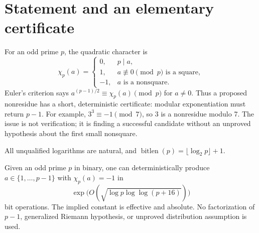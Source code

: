 \begin{abstract}
Given an odd prime $p$, a quadratic nonresidue is a nonzero residue which
is not a square modulo $p$.  We give a deterministic construction using
\[
 \exp\!\bigl(O(\sqrt{\log p\log\log(p+16)})\bigr)
\]
bit operations, with effective absolute constants.  The algorithm does
not require a factorization of $p-1$.  It tests a rigorously specified
finite list of rational integers and modular images of units and small
principal-ideal generators in quadratic and biquadratic fields.
A sparse positive-semidefinite Gram average, including ramified primes,
forces one negative character value; a uniform varying-field Burgess
estimate supplies the contradiction if none exists.  This manuscript
contains the complete compatible-root construction, parameter choice,
enumeration algorithm, character assembly, and analytic proof.  Its
certificate is simply Euler's criterion, so the output is independently
verified by one modular exponentiation.
\end{abstract}

\tableofcontents

\section{Statement and an elementary certificate}

For an odd prime $p$, the quadratic character is
\[
 \chi_p(a)=
 \begin{cases}
 0,&p\mid a,\\
 1,&a\not\equiv0\pmod p\text{ is a square},\\
 -1,&a\text{ is a nonsquare}.
 \end{cases}
\]
Euler's criterion says
$a^{(p-1)/2}\equiv\chi_p(a)\pmod p$ for $a\ne0$.
Thus a proposed nonresidue has a short, deterministic certificate:
modular exponentiation must return $p-1$.
For example, $3^3\equiv-1\pmod7$, so 3 is a nonresidue modulo 7.
The issue is not verification; it is finding a successful candidate
without an unproved hypothesis about the first small nonsquare.

All unqualified logarithms are natural, and
$\operatorname{bitlen}(p)=\lfloor\log_2p\rfloor+1$.

\begin{theorem}
\label{thm:qnr-main}
Given an odd prime $p$ in binary, one can deterministically produce
$a\in\{1,\ldots,p-1\}$ with $\chi_p(a)=-1$ in
\begin{equation}
 \exp\!\bigl(O(\sqrt{\log p\log\log(p+16)})\bigr)
 \label{eq:qnr-cost}
\end{equation}
bit operations.  The implied constant is effective and absolute.
No factorization of $p-1$, generalized Riemann hypothesis, or
unproved distribution assumption is used.
\end{theorem}


